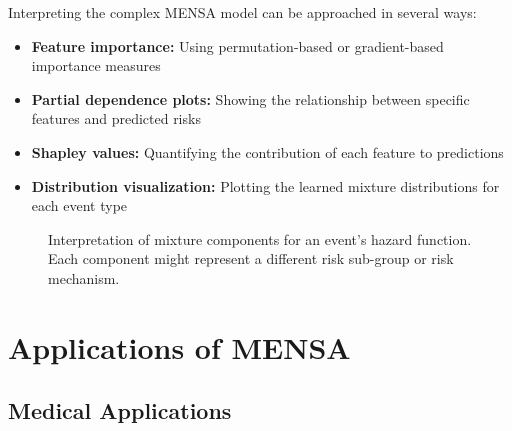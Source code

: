 Interpreting the complex MENSA model can be approached in several ways:

\begin{itemize}
    \item \textbf{Feature importance:} Using permutation-based or gradient-based importance measures
    \item \textbf{Partial dependence plots:} Showing the relationship between specific features and predicted risks
    \item \textbf{Shapley values:} Quantifying the contribution of each feature to predictions
    \item \textbf{Distribution visualization:} Plotting the learned mixture distributions for each event type
\end{itemize}

\begin{figure}[htbp]
    \centering
    \caption{Interpretation of mixture components for an event's hazard function. Each component might represent a different risk sub-group or risk mechanism.}
    \label{fig:mixture-interpretation}
\end{figure}

\section{Applications of MENSA}

\subsection{Medical Applications}

